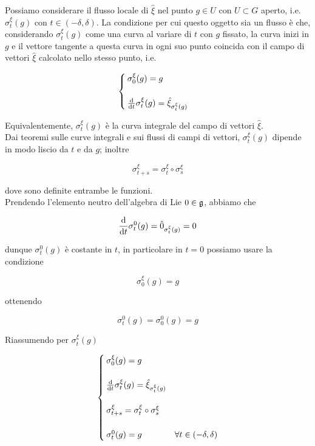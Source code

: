 Possiamo considerare il flusso locale di $ \hat{\xi} $ nel punto $ g \in U $ con $ U \subset G $ aperto, i.e. $ \sigma_{t}^{\xi}(g) $ con $ t \in (-\delta,\delta) $. La condizione per cui questo oggetto sia un flusso è che, considerando $ \sigma_{t}^{\xi}(g) $ come una curva al variare di $ t $ con $ g $ fissato, la curva inizi in $ g $ e il vettore tangente a questa curva in ogni suo punto coincida con il campo di vettori $ \hat{\xi} $ calcolato nello stesso punto, i.e.

\begin{equation}
	\begin{cases}
		\sigma_{0}^{\xi}(g) = g\\\\
		\dv{t} \sigma_{t}^{\xi}(g) = \hat{\xi}_{\sigma_{t}^{\xi}(g)}
	\end{cases}
\end{equation}

Equivalentemente, $ \sigma_{t}^{\xi}(g) $ è la curva integrale del campo di vettori $ \hat{\xi} $.\\
Dai teoremi sulle curve integrali e sui flussi di campi di vettori, $ \sigma_{t}^{\xi}(g) $ dipende in modo liscio da $ t $ e da $ g $; inoltre

\begin{equation}
	\sigma_{t+s}^{\xi} = \sigma_{t}^{\xi} \circ \sigma_{s}^{\xi}
\end{equation}

dove sono definite entrambe le funzioni.\\
Prendendo l'elemento neutro dell'algebra di Lie $ 0 \in \mathfrak{g} $, abbiamo che

\begin{equation}
	\dv{t} \sigma_{t}^{0}(g) = \hat{0}_{\sigma_{t}^{\xi}(g)} = 0
\end{equation}

dunque $ \sigma_{t}^{0}(g) $ è costante in $ t $, in particolare in $ t=0 $ possiamo usare la condizione

\begin{equation}
	\sigma_{0}^{\xi}(g) = g
\end{equation}

ottenendo

\begin{equation}
	\sigma_{t}^{0}(g) = \sigma_{0}^{0}(g) = g
\end{equation}

Riassumendo per $ \sigma_{t}^{\xi}(g) $

\begin{equation}
	\begin{cases}
		\sigma_{0}^{\xi}(g) = g\\\\
		\dv{t} \sigma_{t}^{\xi}(g) = \hat{\xi}_{\sigma_{t}^{\xi}(g)}\\\\
		\sigma_{t+s}^{\xi} = \sigma_{t}^{\xi} \circ \sigma_{s}^{\xi}\\\\
		\sigma_{t}^{0}(g) = g & \forall t \in (-\delta,\delta)
	\end{cases}
\end{equation}

